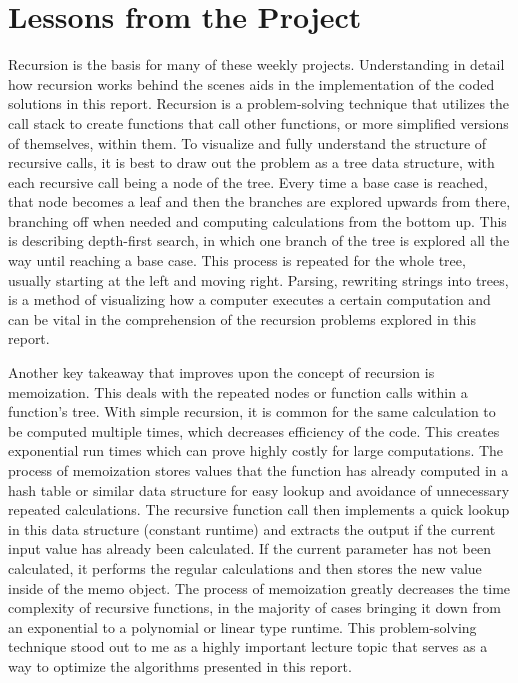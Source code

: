 \documentclass{article}
\theoremstyle{theorem}
\theoremstyle{definition}
\theoremstyle{remark}
\begin{document}
\section{Lessons from the Project}

Recursion is the basis for many of these weekly projects. Understanding in detail how recursion works behind the scenes aids in the implementation of the coded solutions in this report. Recursion is a problem-solving technique that utilizes the call stack to create functions that call other functions, or more simplified versions of themselves, within them. To visualize and fully understand the structure of recursive calls, it is best to draw out the problem as a tree data structure, with each recursive call being a node of the tree. Every time a base case is reached, that node becomes a leaf and then the branches are explored upwards from there, branching off when needed and computing calculations from the bottom up. This is describing depth-first search, in which one branch of the tree is explored all the way until reaching a base case. This process is repeated for the whole tree, usually starting at the left and moving right. Parsing, rewriting strings into trees, is a method of visualizing how a computer executes a certain computation and can be vital in the comprehension of the recursion problems explored in this report. 

Another key takeaway that improves upon the concept of recursion is memoization. This deals with the repeated nodes or function calls within a function's tree. With simple recursion, it is common for the same calculation to be computed multiple times, which decreases efficiency of the code. This creates exponential run times which can prove highly costly for large computations. The process of memoization stores values that the function has already computed in a hash table or similar data structure for easy lookup and avoidance of unnecessary repeated calculations. The recursive function call then implements a quick lookup in this data structure (constant runtime) and extracts the output if the current input value has already been calculated. If the current parameter has not been calculated, it performs the regular calculations and then stores the new value inside of the memo object. The process of memoization greatly decreases the time complexity of recursive functions, in the majority of cases bringing it down from an exponential to a polynomial or linear type runtime. This problem-solving technique stood out to me as a highly important lecture topic that serves as a way to optimize the algorithms presented in this report.
\end{document}
